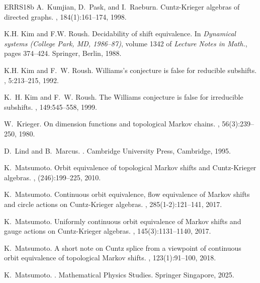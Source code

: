 \documentclass[12pt]{amsbook}%
\theoremstyle{defin}
\theoremstyle{remark}
\numberwithin{equation}{chapter}
\numberwithin{theor}{section}
\begin{document}
\begin{thebibliography}{ERRS18b}
A.~Kumjian, D.~Pask, and I.~Raeburn.
\newblock Cuntz-{K}rieger algebras of directed graphs.
, 184(1):161--174, 1998.

K.H. Kim and F.W. Roush.
\newblock Decidability of shift equivalence.
\newblock In {\em Dynamical systems ({C}ollege {P}ark, {MD}, 1986--87)}, volume
  1342 of {\em Lecture Notes in Math.}, pages 374--424. Springer, Berlin, 1988.

K.H. Kim and F.~W. Roush.
\newblock Williams's conjecture is false for reducible subshifts.
, 5:213--215, 1992.

K.~H. Kim and F.~W. Roush.
\newblock The {Williams} conjecture is false for irreducible subshifts.
, 149:545--558, 1999.

W.~Krieger.
\newblock On dimension functions and topological {M}arkov chains.
, 56(3):239--250, 1980.

D.~Lind and B.~Marcus.
.
\newblock Cambridge University Press, Cambridge, 1995.

K.~Matsumoto.
\newblock Orbit equivalence of topological {M}arkov shifts and
  {C}untz-{K}rieger algebras.
, (246):199--225, 2010.

K.~Matsumoto.
\newblock Continuous orbit equivalence, flow equivalence of {M}arkov shifts and
  circle actions on {C}untz-{K}rieger algebras.
, 285(1-2):121--141, 2017.

K.~Matsumoto.
\newblock Uniformly continuous orbit equivalence of {M}arkov shifts and gauge
  actions on {C}untz-{K}rieger algebras.
, 145(3):1131--1140, 2017.

K.~Matsumoto.
\newblock A short note on {C}untz splice from a viewpoint of continuous orbit
  equivalence of topological {M}arkov shifts.
, 123(1):91--100, 2018.

K.~Matsumoto.
.
\newblock Mathematical Physics Studies. Springer Singapore, 2025.


\end{thebibliography}
\end{document}
